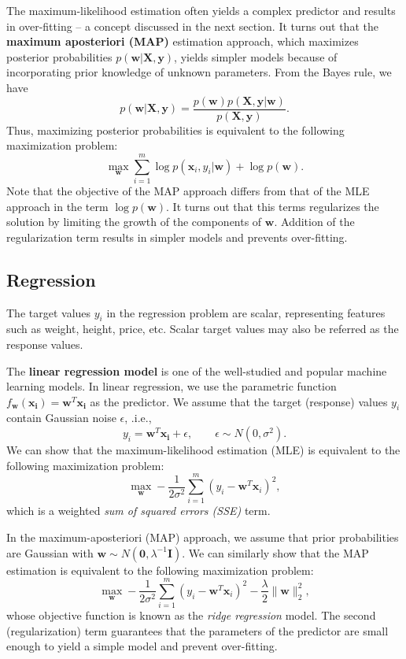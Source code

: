 \documentclass[11pt]{article}
\begin{document}
The maximum-likelihood estimation often yields a complex predictor and results in over-fitting -- a concept discussed in the next section. It turns out that the \textbf{maximum aposteriori (MAP)} estimation approach, which maximizes posterior probabilities \(p(\boldsymbol{w}|\boldsymbol{X},\boldsymbol{y})\), yields simpler models because of incorporating prior knowledge of unknown parameters. From the Bayes rule, we have
\[
p(\boldsymbol{w}|\boldsymbol{X},\boldsymbol{y})=\frac{p(\boldsymbol{w})p(\boldsymbol{X},\boldsymbol{y}|\boldsymbol{w})}{p(\boldsymbol{X},\boldsymbol{y})}.
\]
Thus, maximizing posterior probabilities is equivalent to the following maximization problem:
\[ 
  \max_{\boldsymbol{w}} \sum_{i=1}^m \log p(\boldsymbol{x}_i,y_i|\boldsymbol{w})+\log p(\boldsymbol{w}).
\]
Note that the objective of the MAP approach differs from that of the MLE approach in the term \(\log p(\boldsymbol{w})\). It turns out that this terms regularizes the solution by limiting the growth of the components of \(\boldsymbol{w}\). Addition of the regularization term results in simpler models and prevents over-fitting. 

\subsection{\label{orgtarget1} Regression}
\label{sec:orgheadline3}
The target values \(y_i\) in the regression problem are scalar, representing features such as weight, height, price, etc. Scalar target values may also be referred as the response values.

The \textbf{linear regression model} is one of the well-studied and popular machine learning models. In linear regression, we use the parametric function \(f_{\boldsymbol{w}}(\boldsymbol{x_i})=\boldsymbol{w}^T\boldsymbol{x_i}\) as the predictor. We assume that the target (response) values \(y_i\) contain Gaussian noise \(\epsilon\), .i.e.,
\[
  y_i = \boldsymbol{w}^T\boldsymbol{x_i} + \epsilon,\qquad \epsilon \sim N(0,\sigma^2).
\]
We can show that the maximum-likelihood estimation (MLE) is equivalent to the following maximization problem:
\[
  \max_{\boldsymbol{w}} -\frac{1}{2\sigma^2}\sum_{i=1}^m (y_i-\boldsymbol{w}^T\boldsymbol{x}_i)^2,
\]
which is a weighted \emph{sum of squared errors (SSE)} term.

In the maximum-aposteriori (MAP) approach, we assume that prior probabilities are Gaussian with \(\boldsymbol{w}\sim N(\boldsymbol{0}, \lambda^{-1}\boldsymbol{I})\). We can similarly show that the MAP estimation is equivalent to the following maximization problem:
\[
  \max_{\boldsymbol{w}} -\frac{1}{2\sigma^2}\sum_{i=1}^m (y_i-\boldsymbol{w}^T\boldsymbol{x}_i)^2 - \frac{\lambda}{2}\|\boldsymbol{w}\|_2^2,
\]
whose objective function is known as the \emph{ridge regression} model. The second (regularization) term guarantees that the parameters of the predictor are small enough to yield a simple model and prevent over-fitting.
\end{document}
